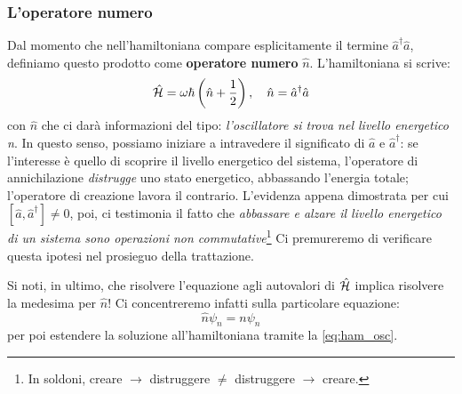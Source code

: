 \subsubsection{L'operatore numero}
Dal momento che nell'hamiltoniana compare esplicitamente il termine $\hat{a}^\dagger\hat{a}$, definiamo questo prodotto come \textbf{operatore numero} $\hat{n}$. L'hamiltoniana si scrive:
\begin{equation}
    \hat{\mathcal{H}} = \omega \hbar \left( \hat{n} + \frac{1}{2} \right)
    \label{eq:ham_osc}, \quad \hat{n} = \hat{a}^\dagger\hat{a}
\end{equation}
con $\hat{n}$ che ci darà informazioni del tipo: \emph{l'oscillatore si trova nel livello energetico n}. In questo senso, possiamo iniziare a intravedere il significato di $\hat{a}$ e $\hat{a}^\dagger$: se l'interesse è quello di scoprire il livello energetico del sistema, l'operatore di annichilazione \emph{distrugge} uno stato energetico, abbassando l'energia totale; l'operatore di creazione lavora il contrario. L'evidenza appena dimostrata per cui $[\hat{a}, \hat{a}^\dagger] \neq 0$, poi, ci testimonia il fatto che \emph{abbassare e alzare il livello energetico di un sistema sono operazioni non commutative}\footnote{In soldoni, creare $\to$ distruggere $\neq$ distruggere $\to$ creare.} Ci premureremo di verificare questa ipotesi nel prosieguo della trattazione.

Si noti, in ultimo, che risolvere l'equazione agli autovalori di $\hat{\mathcal{H}}$ implica risolvere la medesima per $\hat{n}$! Ci concentreremo infatti sulla particolare equazione:
\[
    \hat{n}\psi_n = {n} \psi_n
\]
per poi estendere la soluzione all'hamiltoniana tramite la \eqref{eq:ham_osc}.

